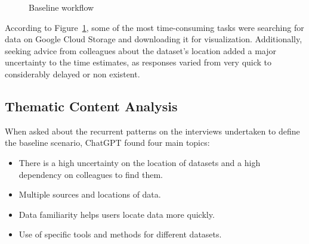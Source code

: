 \documentclass[
  oneside,
  open=any]{scrbook}
\providecommand{\tightlist}{%
  \setlength{\itemsep}{0pt}\setlength{\parskip}{0pt}}\usepackage{longtable,booktabs,array}
\begin{document}
\begin{figure}[H]


\caption{\label{fig-baseline}Baseline workflow}

\end{figure}%

According to Figure~\ref{fig-baseline}, some of the most time-consuming
tasks were searching for data on Google Cloud Storage and downloading it
for visualization. Additionally, seeking advice from colleagues about
the dataset's location added a major uncertainty to the time estimates,
as responses varied from very quick to considerably delayed or non
existent.

\subsection{Thematic Content Analysis}\label{thematic-content-analysis}

When asked about the recurrent patterns on the interviews undertaken to
define the baseline scenario, ChatGPT found four main topics:

\begin{itemize}
\tightlist
\item
  There is a high uncertainty on the location of datasets and a high
  dependency on colleagues to find them.
\item
  Multiple sources and locations of data.
\item
  Data familiarity helps users locate data more quickly.
\item
  Use of specific tools and methods for different datasets.
\end{itemize}
\end{document}
